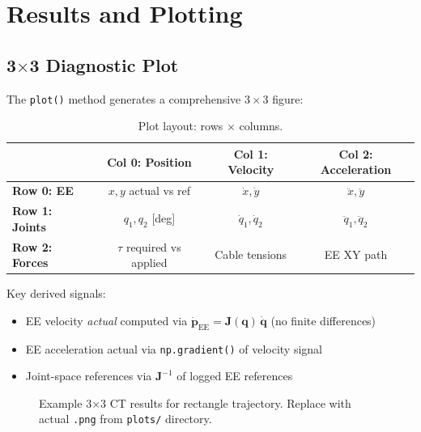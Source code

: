 \documentclass[11pt,a4paper]{article}
\newcommand{\bq}{\bm{q}}
\newcommand{\bdq}{\dot{\bm{q}}}
\newcommand{\bJ}{\bm{J}}
\begin{document}
\section{Results and Plotting}
\label{sec:results}

\subsection{3$\times$3 Diagnostic Plot}

The \texttt{plot()} method generates a comprehensive $3 \times 3$ figure:

\begin{table}[h]
\centering
\caption{Plot layout: rows $\times$ columns.}
\begin{tabular}{lccc}
\toprule
 & \textbf{Col 0: Position} & \textbf{Col 1: Velocity} & \textbf{Col 2: Acceleration} \\
\midrule
\textbf{Row 0: EE}     & $x, y$ actual vs ref & $\dot x, \dot y$ & $\ddot x, \ddot y$ \\
\textbf{Row 1: Joints}  & $q_1, q_2$ [deg]    & $\dot q_1, \dot q_2$ & $\ddot q_1, \ddot q_2$ \\
\textbf{Row 2: Forces}  & $\tau$ required vs applied & Cable tensions & EE XY path \\
\bottomrule
\end{tabular}
\end{table}

\noindent Key derived signals:
\begin{itemize}[leftmargin=2em]
    \item EE velocity \emph{actual} computed via $\dot{\bm{p}}_{\mathrm{EE}} = \bJ(\bq)\,\bdq$ (no finite differences)
    \item EE acceleration actual via \texttt{np.gradient()} of velocity signal
    \item Joint-space references via $\bJ^{-1}$ of logged EE references
\end{itemize}

\begin{figure}[H]
\centering
{}
\caption{Example 3$\times$3 CT results for rectangle trajectory. Replace with actual \texttt{.png} from \texttt{plots/} directory.}
\label{fig:results_pydrake}
\end{figure}
\end{document}

